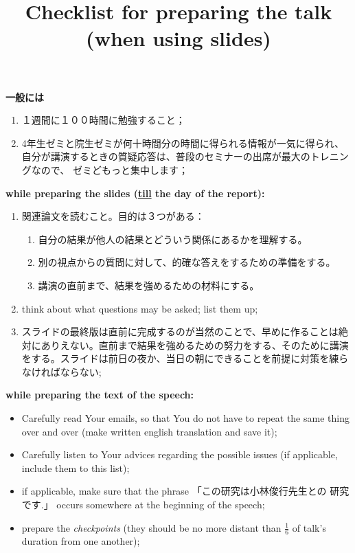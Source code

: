 \documentclass[12pt]{article} %
\title{Checklist for preparing the talk (when using slides)}
\newcommand{\kana}[2]{\ruby{#1}{#2}}
\begin{document}
	\maketitle
	\noindent\textbf{一般には}
    \begin{enumerate}
	    \item １週間に１００時間に勉強すること；
	    \item 4年生ゼミと院生ゼミが何十時間分の時間に得られる情報が一気に得られ、自分が講演するときの質疑応答は、普段のセミナーの出席が最大のトレニングなので、
		    ゼミどもっと集中します；
    \end{enumerate}
    \noindent\textbf{while preparing the slides (\underline{till} the day of the report):}
    \begin{enumerate}
	    \item 関連論文を読むこと。目的は３つがある：\begin{enumerate}
			    \item 自分の結果が他人の結果とどういう関係にあるかを理解する。　
			    \item 別の視点からの質問に対して、的確な答えをするための準備をする。
			    \item 講演の直前まで、結果を強めるための材料にする。
		    \end{enumerate}
        \item think about what questions may be asked; list them up;
	\item スライドの最終版は直前に完成するのが当然のことで、早めに作ることは絶対にありえない。直前まで結果を強めるための努力をする、そのために講演をする。スライドは前日の夜か、当日の朝にできることを前提に対策を練らなければならない;
    \end{enumerate}
	\noindent\textbf{while preparing the text of the speech:}
	\begin{itemize}
		\item Carefully read Your emails, so that You do not have to repeat the same thing over and over (make written english translation
			and save it);
		\item Carefully listen to Your advices regarding the possible issues (if applicable, include them to this list);
		\item if applicable, make sure that the phrase 「この研究は小林俊行先生との\kana{共同}{キョウドウ}
            研究です.」 occurs somewhere at the beginning of the speech;
        \item prepare the {\it checkpoints} (they should be no more distant than $\frac{1}{6}$ of talk's duration
            from one another);
	\end{itemize}
\end{document}
